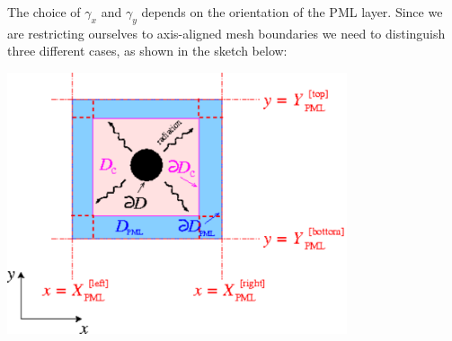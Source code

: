 The choice of $ \gamma_x $ and $ \gamma_y $ depends on the orientation of the P\+ML layer. Since we are restricting ourselves to axis-\/aligned mesh boundaries we need to distinguish three different cases, as shown in the sketch below\+:

 
\begin{DoxyImage}
\includegraphics[width=0.75\textwidth]{pml_meshes}
\end{DoxyImage}



